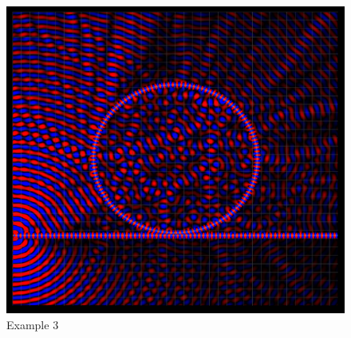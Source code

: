 \begin{figure}[H]
	\centering
	\includegraphics[width=\textwidth,
	keepaspectratio]{example3.png}
	\caption{Example 3}
	\label{fig:example3}
\end{figure}


